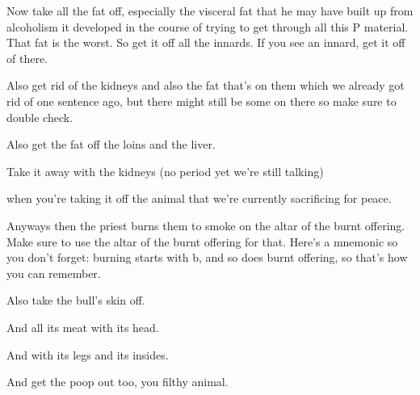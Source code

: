 {
}
{
}
{
	Now take all the fat off, especially the visceral fat that he
	may have built up from alcoholism it developed in the course
	of trying to get through all this P material. That fat is the
	worst. So get it off all the innards. If you see an innard,
	get it off of there.
}

{
}
{
}
{
	Also get rid of the kidneys and also the fat that's on them
	which we already got rid of one sentence ago, but there
	might still be some on there so make sure to double check.

	Also get the fat off the loins and the liver.
	
	Take it away with the kidneys (no period yet we're still talking)
}

{
}
{
}
{
	when you're taking it off the animal that we're currently
	sacrificing for peace.

	Anyways then the priest burns them to smoke on the altar
	of the burnt offering. Make sure to use the altar of the
	burnt offering for that. Here's a mnemonic so you don't
	forget: burning starts with b, and so does burnt offering,
	so that's how you can remember.
}

{
}
{
}
{
	Also take the bull's skin off.
	
	And all its meat with its head.
	
	And with its legs and its insides.
	
	And get the poop out too, you filthy animal.
}

